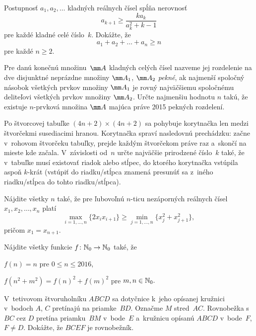 {%
Postupnosť $a_1,a_2,\dots$ kladných reálnych čísel spĺňa nerovnosť
$$
{a_{k+1}\ge \frac{ka_k}{a_k^2+k-1}}
$$
pre každé kladné celé číslo~$k$.
Dokážte, že
$$
{a_1+a_2+\ldots +a_n\ge n}
$$
pre každé $n\ge 2$.}

{%
Pre danú konečnú množinu~$\mm A$ kladných celých čísel nazveme jej rozdelenie na dve disjunktné neprázdne množiny $\mm A_1$, $\mm A_2$ {\it pekné}, ak najmenší spoločný násobok všetkých prvkov množiny $\mm A_1$ je rovný najväčšiemu spoločnému deliteľovi všetkých prvkov množiny $\mm A_2$. Určte najmenšiu hodnotu $n$ takú, že existuje $n$-prvková množina $\mm A$ majúca práve 2015 pekných rozdelení.}

{%
Po štvorcovej tabuľke $(4n + 2)\times (4n + 2)$ sa pohybuje korytnačka len medzi štvorčekmi susediacimi hranou. Korytnačka spraví nasledovnú prechádzku: začne v~rohovom štvorčeku tabuľky, prejde každým štvorčekom práve raz a~skončí na mieste kde začala. V~závislosti od~$n$ určte najväčšie prirodzené číslo~$k$ také, že v~tabuľke musí existovať riadok alebo stĺpec, do ktorého korytnačka vstúpila aspoň $k$-krát (vstúpiť do riadku/stĺpca znamená presunúť sa z~iného riadku/stĺpca do tohto riadku/stĺpca).}

{%
Nájdite všetky $n$ také, že pre ľubovoľnú $n$-ticu nezáporných reálnych čísel $x_1, x_2, \dots, x_n$ platí
$$
\max_{i=1,...,n}\{2x_ix_{i+1}\}\ge\min_{j=1,...,n}\{x_j^2+x_{j+1}^2\},
$$
pričom $x_1=x_{n+1}$.}

{%
Nájdite všetky funkcie $f\colon\Bbb{N}_0\to\Bbb{N}_0$ také, že
\item $f(n)=n$ pre $0\le n\le 2016$,
\item $f(n^2+m^2)=f(n)^2+f(m)^2$ pre $m,n\in\Bbb{N}_0.$
\endgraf}

{%
V~tetivovom štvoruholníku $ABCD$ sa dotyčnice k~jeho opísanej kružnici v~bodoch $A$, $C$ pretínajú na priamke~$BD$. Označme $M$ stred~$AC$. Rovnobežka s~$BC$ cez $D$ pretína priamku~$BM$ v~bode~$E$ a~kružnicu opísanú $ABCD$ v~bode~$F$, $F\ne D$. Dokážte, že $BCEF$ je rovnobežník.}

